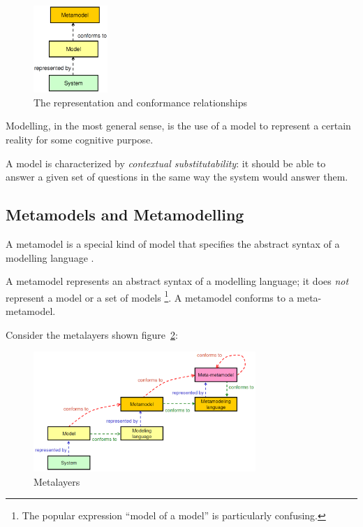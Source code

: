 \begin{figure}[h]
	\centering
	\includegraphics[width=0.25\textwidth]{images/representation-and-conformance-relationships.png}
	\caption{The representation and conformance relationships}
	\label{figure:representation-and-conformance}
\end{figure}

Modelling, in the most general sense, is the use of a model to represent a certain reality for some cognitive purpose.

A model is characterized by \textit{contextual substitutability}: it should be able to answer a given set of questions in the same way the system would answer them.

\subsection*{Metamodels and Metamodelling}

A metamodel is a special kind of model that specifies the abstract syntax of a modelling language \cite{OMG-MDA-Foundation-Model}.

A metamodel represents an abstract syntax of a modelling language; it does \textit{not} represent a model or a set of models
\footnote{The popular expression ``model of a model'' is particularly confusing.}.
A metamodel conforms to a meta-metamodel.

Consider the metalayers shown figure~\ref{figure:metalayers}:

\begin{figure}[h]
	\centering
	\includegraphics[width=0.75\textwidth]{images/metalayers.png}
	\caption{Metalayers}
	\label{figure:metalayers}
\end{figure}

